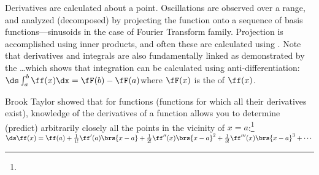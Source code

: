 Derivatives are calculated  about a point.
Oscillations are observed  over a range,
and analyzed (decomposed) by projecting the function onto a sequence of basis functions---sinusoids 
in the case of Fourier Transform family.
Projection is accomplished using inner products, and often these are calculated using .
Note that derivatives and integrals are also fundamentally linked as demonstrated by the
\ldots which shows that integration 
can be calculated using anti-differentiation:
\\\indentx$\ds\int_a^b \ff(x)\dx = \fF(b) - \fF(a)$\qquad where $\fF(x)$ is the  of $\ff(x)$.


Brook Taylor showed that for  functions (functions for which all their derivatives exist),
knowledge of the derivatives of a function 
allows you to determine (predict) arbitrarily closely all the points in the vicinity of $x=a$:\footnote{
}
\\\indentx$\ds\ff(x) = \ff(a) + \frac{1}{1!}\ff'  (a)\brs{x-a}
                              + \frac{1}{2!}\ff'' (x)\brs{x-a}^2
                              + \frac{1}{3!}\ff'''(x)\brs{x-a}^3
                              + \cdots
                  $

